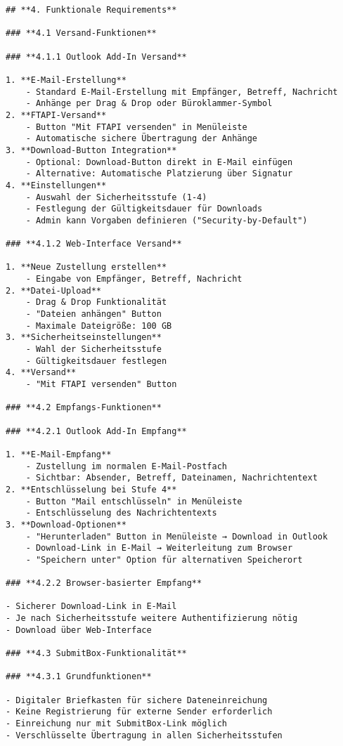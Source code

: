 \begin{Verbatim}[breaklines=true]
## **4. Funktionale Requirements**

### **4.1 Versand-Funktionen**

### **4.1.1 Outlook Add-In Versand**

1. **E-Mail-Erstellung**
    - Standard E-Mail-Erstellung mit Empfänger, Betreff, Nachricht
    - Anhänge per Drag & Drop oder Büroklammer-Symbol
2. **FTAPI-Versand**
    - Button "Mit FTAPI versenden" in Menüleiste
    - Automatische sichere Übertragung der Anhänge
3. **Download-Button Integration**
    - Optional: Download-Button direkt in E-Mail einfügen
    - Alternative: Automatische Platzierung über Signatur
4. **Einstellungen**
    - Auswahl der Sicherheitsstufe (1-4)
    - Festlegung der Gültigkeitsdauer für Downloads
    - Admin kann Vorgaben definieren ("Security-by-Default")

### **4.1.2 Web-Interface Versand**

1. **Neue Zustellung erstellen**
    - Eingabe von Empfänger, Betreff, Nachricht
2. **Datei-Upload**
    - Drag & Drop Funktionalität
    - "Dateien anhängen" Button
    - Maximale Dateigröße: 100 GB
3. **Sicherheitseinstellungen**
    - Wahl der Sicherheitsstufe
    - Gültigkeitsdauer festlegen
4. **Versand**
    - "Mit FTAPI versenden" Button

### **4.2 Empfangs-Funktionen**

### **4.2.1 Outlook Add-In Empfang**

1. **E-Mail-Empfang**
    - Zustellung im normalen E-Mail-Postfach
    - Sichtbar: Absender, Betreff, Dateinamen, Nachrichtentext
2. **Entschlüsselung bei Stufe 4**
    - Button "Mail entschlüsseln" in Menüleiste
    - Entschlüsselung des Nachrichtentexts
3. **Download-Optionen**
    - "Herunterladen" Button in Menüleiste → Download in Outlook
    - Download-Link in E-Mail → Weiterleitung zum Browser
    - "Speichern unter" Option für alternativen Speicherort

### **4.2.2 Browser-basierter Empfang**

- Sicherer Download-Link in E-Mail
- Je nach Sicherheitsstufe weitere Authentifizierung nötig
- Download über Web-Interface

### **4.3 SubmitBox-Funktionalität**

### **4.3.1 Grundfunktionen**

- Digitaler Briefkasten für sichere Dateneinreichung
- Keine Registrierung für externe Sender erforderlich
- Einreichung nur mit SubmitBox-Link möglich
- Verschlüsselte Übertragung in allen Sicherheitsstufen


\end{Verbatim}
